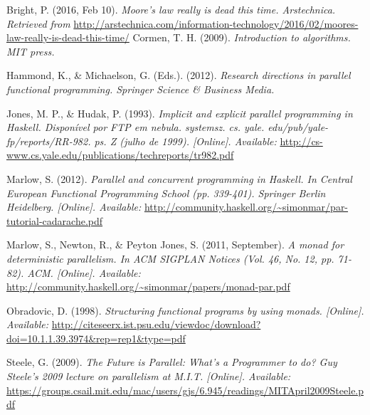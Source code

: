 \documentclass[12pt,a4paper]{article}
\begin{document}
	\begin{thebibliography}{9}
		
		Bright, P. (2016, Feb 10). 
		\textit{Moore’s law really is dead this time. Arstechnica. Retrieved from }	    			
		\url{http://arstechnica.com/information-technology/2016/02/moores-law-really-is-dead-this-time/}
		 Cormen, T. H. (2009). 
		 \textit{Introduction to algorithms. MIT press.}
		 
        Hammond, K., \& Michaelson, G. (Eds.). (2012).
		\textit{Research directions in parallel functional programming. Springer Science \& Business Media.}

		Jones, M. P., \& Hudak, P. (1993). 
		\textit{Implicit and explicit parallel programming in Haskell. Disponível por FTP em nebula. systemsz. cs. yale. edu/pub/yale-fp/reports/RR-982. ps. Z (julho de 1999). [Online]. Available:}
		\url {http://cs-www.cs.yale.edu/publications/techreports/tr982.pdf}
		
		Marlow, S. (2012). 
		\textit{Parallel and concurrent programming in Haskell. In Central European Functional Programming School (pp. 339-401). Springer Berlin Heidelberg.
[Online]. Available: }			\url{http://community.haskell.org/~simonmar/par-tutorial-cadarache.pdf}
		
		Marlow, S., Newton, R., \& Peyton Jones, S. (2011, September). 
		\textit{A monad for deterministic parallelism. In ACM SIGPLAN Notices (Vol. 46, No. 12, pp. 71-82). ACM. [Online]. Available: }	\url{http://community.haskell.org/~simonmar/papers/monad-par.pdf}
		
		Obradovic, D. (1998). 
		\textit{Structuring functional programs by using monads. [Online]. Available: }	\url{http://citeseerx.ist.psu.edu/viewdoc/download?doi=10.1.1.39.3974&rep=rep1&type=pdf}
		
		Steele, G. (2009). 
		\textit{The Future is Parallel: What's a Programmer to do? Guy Steele's 2009 lecture on parallelism at M.I.T. [Online]. Available: }		\url{https://groups.csail.mit.edu/mac/users/gjs/6.945/readings/MITApril2009Steele.pdf}
		
		\end{thebibliography}
	
\end{document}
